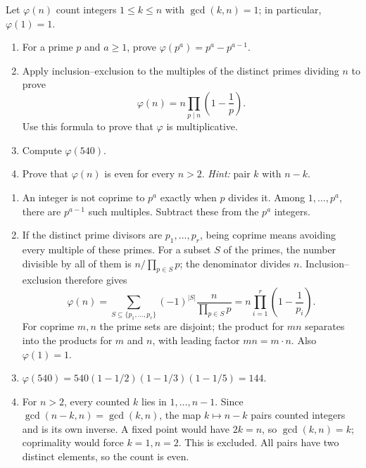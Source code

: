 Let $\varphi(n)$ count integers $1\le k\le n$ with $\gcd(k,n)=1$;
in particular, $\varphi(1)=1$.
\begin{enumerate}
  \item For a prime $p$ and $a\ge1$, prove
  $\varphi(p^a)=p^a-p^{a-1}$. 
  \item Apply inclusion--exclusion to the multiples of the distinct
  primes dividing $n$ to prove
  \[
    \varphi(n)=n\prod_{p\mid n}\left(1-\frac1p\right).
  \]
  Use this formula to prove that $\varphi$ is multiplicative.
  \item Compute $\varphi(540)$. 
  \item Prove that $\varphi(n)$ is even for every $n>2$.
  \emph{Hint:} pair $k$ with $n-k$. 
\end{enumerate}
\begin{solution}
\begin{enumerate}
  \item An integer is not coprime to $p^a$ exactly when $p$ divides it.
  Among $1,\ldots,p^a$, there are $p^{a-1}$ such multiples. Subtract
  these from the $p^a$ integers.
  \item If the distinct prime divisors are $p_1,\ldots,p_r$, being
  coprime means avoiding every multiple of these primes. For a subset
  $S$ of the primes, the number divisible by all of them is
  $n/\prod_{p\in S}p$; the denominator divides $n$.
  Inclusion--exclusion therefore gives
  \[
    \varphi(n)=\sum_{S\subseteq\{p_1,\ldots,p_r\}}
      (-1)^{|S|}\frac{n}{\prod_{p\in S}p}
      =n\prod_{i=1}^r\left(1-\frac1{p_i}\right).
  \]
  For coprime $m,n$ the prime sets are disjoint; the product for $mn$
  separates into the products for $m$ and $n$, with leading factor
  $mn=m\cdot n$. Also $\varphi(1)=1$.
  \item $\varphi(540)=540(1-1/2)(1-1/3)(1-1/5)=144$.
  \item For $n>2$, every counted $k$ lies in $1,\ldots,n-1$.
  Since $\gcd(n-k,n)=\gcd(k,n)$, the map $k\mapsto n-k$
  pairs counted integers and is its own inverse. A fixed point would
  have $2k=n$, so $\gcd(k,n)=k$; coprimality would force $k=1,n=2$.
  This is excluded. All pairs have two distinct elements, so the count
  is even.
\end{enumerate}
\end{solution}

